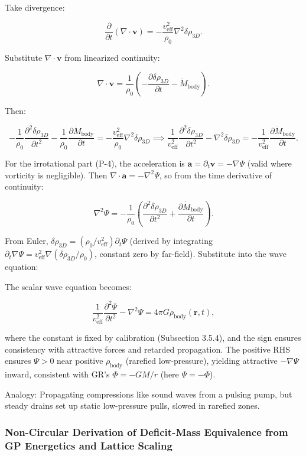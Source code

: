 \documentclass{article}
\begin{document}
Take divergence:

\[
\frac{\partial}{\partial t} (\nabla \cdot \mathbf{v}) = -\frac{v_{\text{eff}}^2}{\rho_0} \nabla^2 \delta \rho_{3D}.
\]

Substitute $\nabla \cdot \mathbf{v}$ from linearized continuity:

\[
\nabla \cdot \mathbf{v} = \frac{1}{\rho_0} \left( -\frac{\partial \delta \rho_{3D}}{\partial t} - \dot{M}_{\text{body}} \right).
\]

Then:

\[
-\frac{1}{\rho_0} \frac{\partial^2 \delta \rho_{3D}}{\partial t^2} - \frac{1}{\rho_0} \frac{\partial \dot{M}_{\text{body}}}{\partial t} = -\frac{v_{\text{eff}}^2}{\rho_0} \nabla^2 \delta \rho_{3D} \implies \frac{1}{v_{\text{eff}}^2} \frac{\partial^2 \delta \rho_{3D}}{\partial t^2} - \nabla^2 \delta \rho_{3D} = -\frac{1}{v_{\text{eff}}^2} \frac{\partial \dot{M}_{\text{body}}}{\partial t}.
\]

For the irrotational part (P-4), the acceleration is $\mathbf{a} = \partial_t \mathbf{v} = -\nabla \Psi$ (valid where vorticity is negligible). Then $\nabla \cdot \mathbf{a} = -\nabla^2 \Psi$, so from the time derivative of continuity:

\[
\nabla^2 \Psi = -\frac{1}{\rho_0} \left( \frac{\partial^2 \delta \rho_{3D}}{\partial t^2} + \frac{\partial \dot{M}_{\text{body}}}{\partial t} \right).
\]

From Euler, $\delta \rho_{3D} = (\rho_0 / v_{\text{eff}}^2) \partial_t \Psi$ (derived by integrating $\partial_t \nabla \Psi = v_{\text{eff}}^2 \nabla (\delta \rho_{3D} / \rho_0)$, constant zero by far-field). Substitute into the wave equation:

The scalar wave equation becomes:

\[
\frac{1}{v_{\text{eff}}^2} \frac{\partial^2 \Psi}{\partial t^2} - \nabla^2 \Psi = 4\pi G \rho_{\text{body}}(\mathbf{r}, t),
\]

where the constant is fixed by calibration (Subsection 3.5.4), and the sign ensures consistency with attractive forces and retarded propagation. The positive RHS ensures $\Psi > 0$ near positive $\rho_{\text{body}}$ (rarefied low-pressure), yielding attractive $-\nabla \Psi$ inward, consistent with GR's $\Phi = -GM/r$ (here $\Psi = -\Phi$).

Analogy: Propagating compressions like sound waves from a pulsing pump, but steady drains set up static low-pressure pulls, slowed in rarefied zones.

\subsubsection{Non-Circular Derivation of Deficit-Mass Equivalence from GP Energetics and Lattice Scaling}
\end{document}
